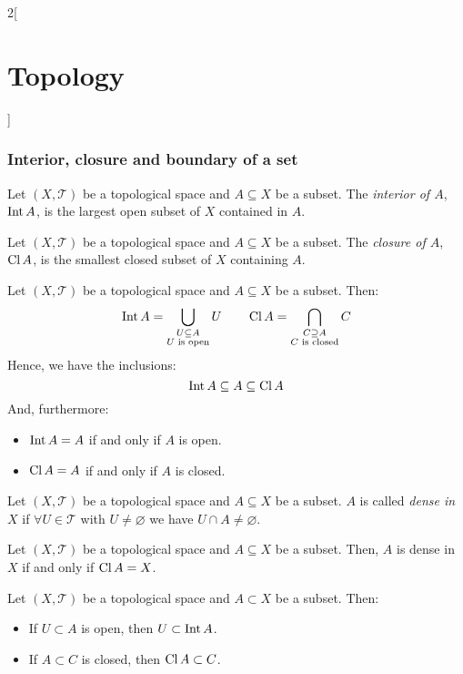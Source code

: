 \documentclass[../../../main.tex]{subfiles}
\begin{document}
\begin{multicols}{2}[\section{Topology}]
  \subsubsection{Interior, closure and boundary of a set}
  \begin{definition}[Interior]
    Let $(X,\mathcal{T})$ be a topological space and $A\subseteq X$ be a subset. The \textit{interior of $A$}, $\operatorname{Int} A$, is the largest open subset of $X$ contained in $A$.
  \end{definition}
  \begin{definition}[Closure]
    Let $(X,\mathcal{T})$ be a topological space and $A\subseteq X$ be a subset. The \textit{closure of $A$}, $\operatorname{Cl} A$, is the smallest closed subset of $X$ containing $A$.
  \end{definition}
  \begin{prop}
    Let $(X,\mathcal{T})$ be a topological space and $A\subseteq X$ be a subset. Then: $$\operatorname{Int} A=\bigcup_{\substack{U\subseteq A\\U\text{ is open}}}U\qquad\operatorname{Cl} A=\bigcap_{\substack{C\supseteq A\\C\text{ is closed}}}C$$
    Hence, we have the inclusions: $$\operatorname{Int} A\subseteq A\subseteq \operatorname{Cl} A$$
    And, furthermore:
    \begin{itemize}
      \item $\operatorname{Int} A=A$ if and only if $A$ is open.
      \item $\operatorname{Cl} A=A$ if and only if $A$ is closed.
    \end{itemize}
  \end{prop}
  \begin{definition}
    Let $(X,\mathcal{T})$ be a topological space and $A\subseteq X$ be a subset. $A$ is called \textit{dense in $X$} if $\forall U\in\mathcal{T}$ with $U\ne\varnothing$ we have $U\cap A\ne\varnothing$.
  \end{definition}
  \begin{prop}
    Let $(X,\mathcal{T})$ be a topological space and $A\subseteq X$ be a subset. Then, $A$ is dense in $X$ if and only if $\operatorname{Cl} A=X$.
  \end{prop}
  \begin{prop}
    Let $(X,\mathcal{T})$ be a topological space and $A\subset X$ be a subset. Then:
    \begin{itemize}
      \item If $U\subset A$ is open, then $U\subset\operatorname{Int} A$.
      \item If $A\subset C$ is closed, then $\operatorname{Cl} A\subset C$.
    \end{itemize}

\end{prop}
\end{multicols}
\end{document}
